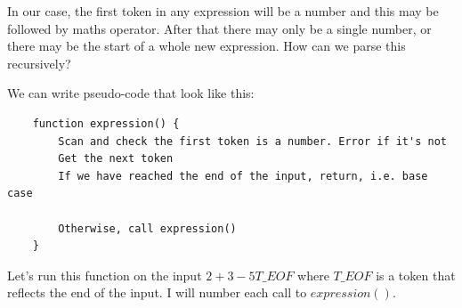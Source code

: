 \documentclass[a4paper,12pt]{article}
\begin{document}
In our case, the first token in any expression will be a number and this may be followed by maths operator. After that there may only be a single number, or there may be the start of a whole new expression. How can we parse this recursively?

We can write pseudo-code that look like this:

\begin{lstlisting}
    function expression() {
        Scan and check the first token is a number. Error if it's not
        Get the next token
        If we have reached the end of the input, return, i.e. base case
      
        Otherwise, call expression()
    }
\end{lstlisting}

Let's run this function on the input $2 + 3 - 5 T\_EOF$ where $T\_EOF$ is a token that reflects the end of the input. I will number each call to $expression()$.
\end{document}
